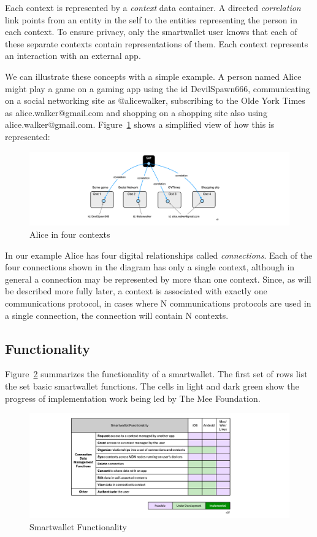 \documentclass[11pt, oneside]{article}   	%
\begin{document}
Each context is represented by a \emph{context} data container. A directed \emph{correlation} link points from an entity in the self to the entities representing the person in each context. To ensure privacy, only the smartwallet user knows that each of these separate contexts contain representations of them. Each context represents an interaction with an external app. 

We can illustrate these concepts with a simple example. A person named Alice might play a game on a gaming app using the id DevilSpawn666, communicating on a social networking site as @alicewalker, subscribing to the Olde York Times as alice.walker@gmail.com and shopping on a shopping site also using alice.walker@gmail.com. Figure~\ref{fig:four-contexts} shows a simplified view of how this is represented:

\begin{figure}[htbp]
\includegraphics[width=\textwidth]{./images/example1.png}
\caption{Alice in four contexts}
\label{fig:four-contexts}
\end{figure}

In our example Alice has four digital relationships called \emph{connections}. Each of the four connections shown in the diagram has only a single context, although in general a connection may be represented by more than one context. Since, as will be described more fully later, a context is associated with exactly one communications protocol, in cases where N communications protocols are used in a single connection, the connection will contain N contexts. 

\subsection{Functionality}

Figure~\ref{fig:functionality} summarizes the functionality of a smartwallet.  The first set of rows list the set basic smartwallet functions.  The cells in light and dark green show the progress of implementation work being led by The Mee Foundation. 

\begin{figure}[htbp]
\includegraphics[width=\textwidth]{./images/functionality.png}
\caption{Smartwallet Functionality}
\label{fig:functionality}
\end{figure}
\end{document}
